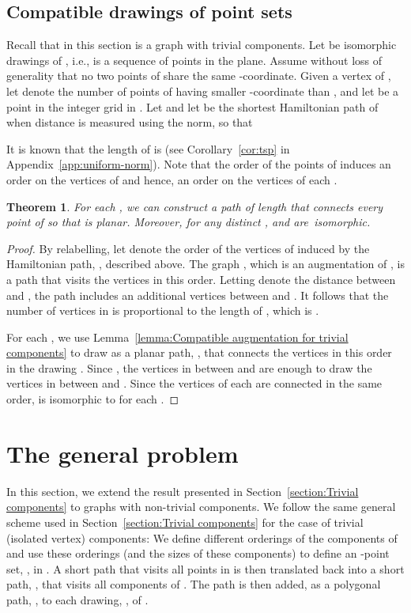 \documentclass[11pt]{patmorin}
\newtheorem{theorem}{Theorem}[section]
\begin{document}
\subsection{Compatible drawings of point sets}

Recall that in this section  is a graph with  trivial components.
Let  be  isomorphic drawings of , i.e.,  is a sequence of  points in the plane.
Assume without loss of generality that no two points of  share the same -coordinate.
Given a vertex  of , let  denote the number of points of  having smaller -coordinate than , and let  be a point in the integer grid  in .  Let  and let  be the shortest Hamiltonian path of  when distance is measured using the  norm, so that

It is known that the length of  is  (see
Corollary~\ref{cor:tsp} in Appendix~\ref{app:uniform-norm}).  Note that
the order of the points of  induces an order on the vertices of
 and hence, an order on the vertices of each .

\begin{theorem}\label{theorem:points}
For each , we can construct a path  of length  that connects every point of  so that  is planar. Moreover, for any distinct ,  and  are~isomorphic.
\end{theorem}
\begin{proof}
By relabelling, let  denote the order of the vertices of  induced by the Hamiltonian path, , described above.  The graph , which is an augmentation of , is a path that visits the vertices  in this order. Letting  denote the  distance between  and , the path  includes an additional  vertices between  and .  It follows that the number of vertices
in  is proportional to the length of , which is .

For each , we use Lemma~\ref{lemma:Compatible augmentation for trivial components} to draw  as a planar path, ,
that connects the vertices  in this order in the drawing .
Since , the 
vertices in  between  and  are enough to
draw the  vertices in 
between  and .
Since the vertices of each  are connected in the same order,
 is isomorphic to  for each .
\end{proof}


\section{The general problem}\label{section:General}
In this section, we extend the result presented in
Section~\ref{section:Trivial components} to graphs with
non-trivial components.  We follow the same general scheme used in
Section~\ref{section:Trivial components} for the case of trivial
(isolated vertex) components:  We define  different
orderings of the components of  and use these orderings (and
the sizes of these components) to define an -point set, , in . A
short path that visits all points in  is then translated back into
a short path, , that visits all components of . The path
 is then
added, as a polygonal path, , to each drawing, , of .
\end{document}
